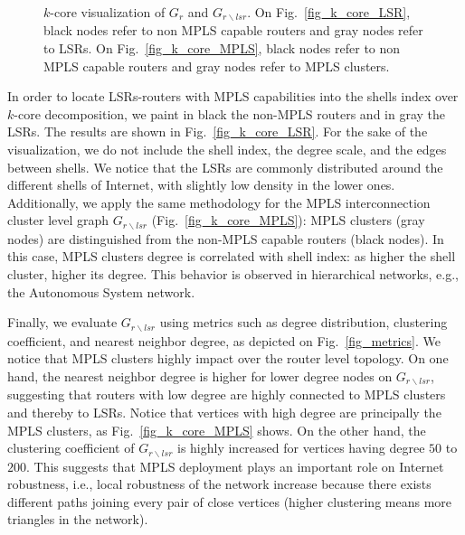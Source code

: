 \begin{figure*}[!t]
  \begin{center}
\hfil
  \end{center}
  \caption{$k$-core visualization of $G_r$ and $G_{r \backslash lsr}$.  On
  Fig.~\ref{fig_k_core_LSR}, black nodes refer to non MPLS capable routers and
  gray nodes refer to LSRs.  On Fig.~\ref{fig_k_core_MPLS}, black nodes refer to
  non MPLS capable routers and gray nodes refer to MPLS clusters.} 
  \label{fig_kcore_overview}
\end{figure*}

In order to locate LSRs-routers with MPLS capabilities into the shells index
over $k$-core decomposition, we paint in black the non-MPLS routers and in gray
the LSRs. The results are shown in Fig.~\ref{fig_k_core_LSR}.  For the sake of
the visualization, we do not include the shell index, the degree scale, and the
edges between shells. We notice that the LSRs are commonly distributed around
the different shells of Internet, with slightly low density in the lower ones.
Additionally, we apply the same methodology for the MPLS interconnection cluster
level graph $G_{r\backslash lsr}$ (Fig.~\ref{fig_k_core_MPLS}): MPLS clusters
(gray nodes) are distinguished from the non-MPLS capable routers (black nodes).
In this case,  MPLS clusters  degree is correlated with shell index: as higher
the shell cluster, higher its degree. This behavior is observed in hierarchical
networks, e.g., the Autonomous System network.

Finally, we evaluate $G_{r \backslash lsr }$ using metrics such as degree
distribution, clustering coefficient, and nearest neighbor degree, as depicted
on Fig.~\ref{fig_metrics}. We notice that MPLS clusters highly impact over the
router level topology. On one hand, the nearest neighbor degree is higher for
lower degree nodes on $G_{r \backslash lsr}$, suggesting that routers with low
degree are highly connected to MPLS clusters and thereby to LSRs. Notice that
vertices with high degree are principally the MPLS clusters, as
Fig.~\ref{fig_k_core_MPLS} shows. On the other hand, the clustering coefficient
of $G_{r \backslash lsr }$ is highly increased for vertices having degree $50$
to $200$. This suggests that MPLS deployment plays an important role on
Internet robustness, i.e., local robustness of the network increase because
there exists different paths joining every pair of close vertices (higher
clustering means more triangles in the network).


